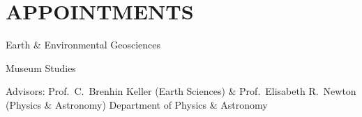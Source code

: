 \section{APPOINTMENTS}

Earth \& Environmental Geosciences

Museum Studies


Advisors: Prof.~C.~Brenhin Keller (Earth Sciences) \& Prof.~Elisabeth R.~Newton (Physics \& Astronomy)
Department of Physics \& Astronomy



